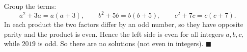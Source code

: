 Group the terms:
\[
a^2+3a=a(a+3),\qquad b^2+5b=b(b+5),\qquad c^2+7c=c(c+7).
\]
In each product the two factors differ by an odd number, so they have opposite parity and the product is even. Hence the left side is even for all integers $a,b,c$, while $2019$ is odd. So there are no solutions (not even in integers). $\blacksquare$

